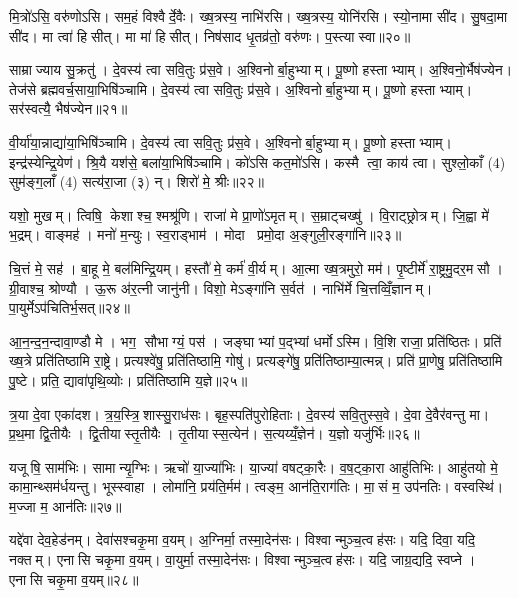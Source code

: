 मि॒त्रो॑ऽसि॒ वरु॑णोऽसि। सम॒हं विश्वैर्दे॒वैः। ख्ष॒त्रस्य॒ नाभि॑रसि। ख्ष॒त्रस्य॒ योनि॑रसि। स्यो॒नामा सी॑द। सु॒षदा॒मा सी॑द। मा त्वा॑ हिसीत्। मा मा॑ हिसीत्। निष॑साद धृ॒तव्र॑तो॒ वरु॑णः। प॒स्त्यास्वा॥२०॥

साम्राज्याय सु॒क्रतु॑। दे॒वस्य॑ त्वा सवि॒तुः प्र॑स॒वे। अ॒श्विनोर्बा॒हुभ्याम्। पू॒ष्णो हस्ताभ्याम्। अ॒श्विनो॒र्भैष॑ज्येन। तेज॑से ब्रह्मवर्च॒साया॒भिषि॑ञ्चामि। दे॒वस्य॑ त्वा सवि॒तुः प्र॑स॒वे। अ॒श्विनोर्बा॒हुभ्याम्। पू॒ष्णो हस्ताभ्याम्। सर॑स्वत्यै॒ भैष॑ज्येन॥२१॥

वी॒र्या॑या॒न्नाद्या॑या॒भिषि॑ञ्चामि। दे॒वस्य॑ त्वा सवि॒तुः प्र॑स॒वे। अ॒श्विनोर्बा॒हुभ्याम्। पू॒ष्णो हस्ताभ्याम्। इन्द्र॑स्येन्द्रि॒येण॑। श्रि॒यै यश॑से॒ बला॑या॒भिषि॑ञ्चामि। को॑ऽसि कत॒मो॑ऽसि। कस्मै त्वा॒ काय॑ त्वा। सुश्लो॒काँ (4) सुम॑ङ्ग॒लाँ (4) सत्य॑रा॒जा (३) न्। शिरो॑ मे॒ श्रीः॥२२॥

यशो॒ मुखम्। त्विषि॒ केशाश्च॒ श्मश्रू॑णि। राजा॑ मे प्रा॒णो॑ऽमृतम्। स॒म्राट्चख्षु॑। वि॒राट्छ्रोत्रम्। जि॒ह्वा मे॑ भ॒द्रम्। वाङ्मह॑। मनो॑ म॒न्युः। स्व॒राड्भाम॑। मोदा प्रमो॒दा अ॒ङ्गुली॒रङ्गा॑नि॥२३॥

चि॒त्तं मे॒ सह॑। बा॒हू मे॒ बल॑मिन्द्रि॒यम्। हस्तौ॑ मे॒ कर्म॑ वी॒र्यम्। आ॒त्मा ख्ष॒त्रमुरो॒ मम॑। पृ॒ष्टीर्मे॑ रा॒ष्ट्रमु॒दर॒मसौ। ग्री॒वाश्च॒ श्रोण्यौ। ऊ॒रू अ॑र॒त्नी जानु॑नी। विशो॒ मेऽङ्गा॑नि स॒र्वत॑। नाभि॑र्मे चि॒त्तव्विँ॒ज्ञानम्। पा॒युर्मेऽप॑चितिर्भ॒सत्॥२४॥

आ॒न॒न्द॒न॒न्दावा॒ण्डौ मे। भग॒ सौभाग्यं॒ पस॑। जङ्घाभ्यां प॒द्भ्यां धर्मोऽस्मि। वि॒शि राजा॒ प्रति॑ष्ठितः। प्रति॑ ख्ष॒त्रे प्रति॑तिष्ठामि रा॒ष्ट्रे। प्रत्यश्वे॑षु॒ प्रति॑तिष्ठामि॒ गोषु॑। प्रत्यङ्गे॑षु॒ प्रति॑तिष्ठाम्या॒त्मन्न्। प्रति॑ प्रा॒णेषु॒ प्रति॑तिष्ठामि पु॒ष्टे। प्रति॒ द्यावा॑पृथि॒व्योः। प्रति॑तिष्ठामि य॒ज्ञे॥२५॥

त्र॒या दे॒वा एका॑दश। त्र॒य॒स्त्रि॒शास्सु॒राध॑सः। बृह॒स्पति॑पुरोहिताः। दे॒वस्य॑ सवि॒तुस्स॒वे। दे॒वा दे॒वैर॑वन्तु मा। प्र॒थ॒मा द्वि॒तीयैः। द्वि॒तीयास्तृ॒तीयैः। तृ॒तीयास्स॒त्येन॑। स॒त्यय्यँ॒ज्ञेन॑। य॒ज्ञो यजु॑र्भिः॥२६॥

यजूषि॒ साम॑भिः। सामान्यृ॒ग्भिः। ऋचो॑ या॒ज्या॑भिः। या॒ज्या॑ वषट्का॒रैः। व॒ष॒ट्का॒रा आहु॑तिभिः। आहु॑तयो मे॒ कामा॒न्थ्सम॑र्धयन्तु। भूस्स्वाहा। लोमा॑नि॒ प्रय॑ति॒र्मम॑। त्वङ्म॒ आन॑ति॒राग॑तिः। मा॒सं म॒ उप॑नतिः। वस्वस्थि॑। म॒ज्जा म॒ आन॑तिः॥२७॥\anuvakamend[प॒स्त्यास्वा सर॑स्वत्यै॒ भैष॑ज्येन॒ श्रीरङ्गा॑नि भ॒सद्य॒ज्ञे य॒ज्ञो यजु॑र्भि॒रुप॑नति॒र्द्वे च॑]

यद्दे॑वा देव॒हेड॑नम्। देवा॑सश्चकृ॒मा व॒यम्। अ॒ग्निर्मा॒ तस्मा॒देन॑सः। विश्वान्मुञ्च॒त्वह॑सः। यदि॒ दिवा॒ यदि॒ नक्तम्। एनासि चकृ॒मा व॒यम्। वा॒युर्मा॒ तस्मा॒देन॑सः। विश्वान्मुञ्च॒त्वह॑सः। यदि॒ जाग्र॒द्यदि॒ स्वप्ने। एनासि चकृ॒मा व॒यम्॥२८॥

